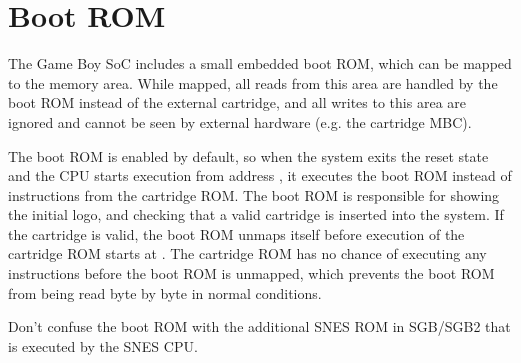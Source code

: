 \documentclass[\main/gbctr.tex]{subfiles}
\begin{document}
\chapter{Boot ROM}

The Game Boy SoC includes a small embedded boot ROM, which can be mapped to the
 memory area. While mapped, all reads from this area are
handled by the boot ROM instead of the external cartridge, and all writes to
this area are ignored and cannot be seen by external hardware (e.g. the
cartridge MBC).

The boot ROM is enabled by default, so when the system exits the reset state
and the CPU starts execution from address , it executes the boot ROM
instead of instructions from the cartridge ROM. The boot ROM is responsible for
showing the initial logo, and checking that a valid cartridge is inserted into
the system. If the cartridge is valid, the boot ROM unmaps itself before
execution of the cartridge ROM starts at . The cartridge ROM has no
chance of executing any instructions before the boot ROM is unmapped, which
prevents the boot ROM from being read byte by byte in normal conditions.

\begin{warning}
  Don't confuse the boot ROM with the additional SNES ROM in SGB/SGB2 that is
  executed by the SNES CPU.
\end{warning}
\end{document}

